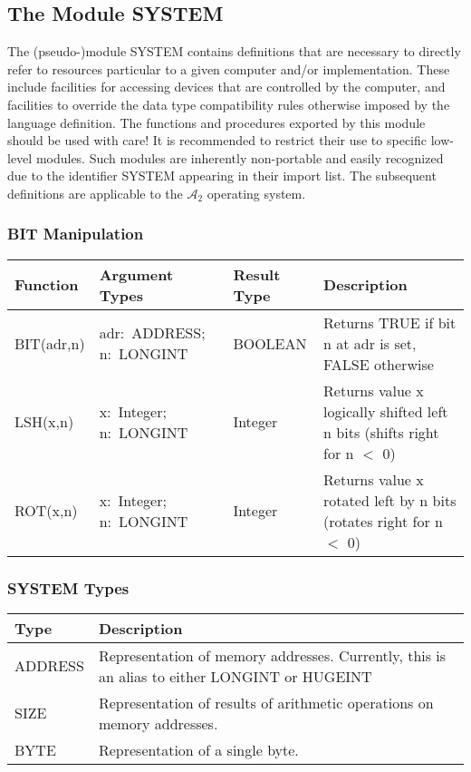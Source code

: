 \documentclass[a4paper,11pt]{article}
\newcommand{\AZ}{\ensuremath{\mathcal{A}_{2}}\xspace}
\begin{document}
\subsection{The Module SYSTEM}
The (pseudo-)module SYSTEM contains definitions that are necessary to directly refer to resources particular to a given computer and/or implementation. These include facilities for accessing devices that are controlled by the computer, and facilities to override the data type compatibility rules otherwise imposed by the language definition. The functions and procedures exported by this module should be used with care! It is recommended to restrict their use to specific low-level modules. Such modules are inherently non-portable and easily recognized due to the identifier SYSTEM appearing in their import list.
The subsequent definitions are applicable to the \AZ operating system.

\subsubsection{BIT Manipulation}
\begin{longtable}{|p{3cm}|v{3cm}|p{2cm}|p{6cm}|}
\hline
Function & Argument Types & Result Type & Description \\
\hline\hline
\endhead
BIT(adr,n) & adr:~ADDRESS; n:~LONGINT & BOOLEAN & Returns TRUE if bit n at adr is set, FALSE otherwise \\
LSH(x,n) & x:~Integer; n:~LONGINT & Integer & Returns value x logically shifted left n bits (shifts right for n $<$ 0) \\
ROT(x,n) & x:~Integer; n:~LONGINT &  Integer & Returns value x rotated left by  n bits (rotates right for n $<$ 0) \\
\hline
\end{longtable}

\subsubsection{SYSTEM Types}
\begin{longtable}{|p{3cm}|p{12cm}|}
\hline
Type & Description \\
\hline\hline
\endhead
ADDRESS & Representation of memory addresses. Currently, this is an alias to either LONGINT or HUGEINT \\
SIZE & Representation of results of arithmetic operations on memory addresses.\\
\hline
BYTE & Representation of a single byte.\\
\hline
\end{longtable}
\end{document}

